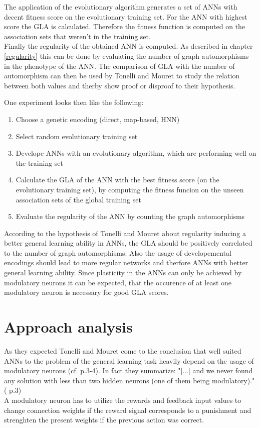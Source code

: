 \documentclass[12pt,twoside]{article}
\theoremstyle{plain}
\theoremstyle{definition}
\theoremstyle{remark}
\begin{document}
The application of the evolutionary algorithm generates a set of ANNs with decent fitness score on the evolutionary training set. For the ANN with highest score the GLA is calculated. Therefore the fitness function is computed on the association sets that weren't in the training set.\\
Finally the regularity of the obtained ANN is computed. As described in chapter \ref{regularity} this can be done by evaluating the number of graph automorphisms in the phenotype of the ANN. The comparison of GLA with the number of automorphism can then be used by Tonelli and Mouret to study the relation between both values and  therby show proof or disproof to their hypothesis. \medskip

One experiment looks then like the following:
\begin{enumerate}
	\item Choose a genetic encoding (direct, map-based, HNN)
	\item Select random evolutionary training set
	\item Develope ANNs with an evolutionary algorithm, which are performing well on the training set
	\item Calculate the GLA of the ANN with the best fitness score (on the evolutionary training set), by computing the fitness funcion on the unseen association sets of the global training set
	\item Evaluate the regularity of the ANN by counting the graph automorphisms
\end{enumerate}

According to the hypothesis of Tonelli and Mouret about regularity inducing a better general learning ability in ANNs, the GLA should be positively correlated to the number of graph automorphisms. 
Also the usage of developemental encodings should lead to more regular networks and therfore ANNs with better general learning ability.
Since plasticity in the ANNs can only be achieved by modulatory neurons it can be expected, that the occurence of at least one modulatory neuron is necessary for good GLA scores. 

\section{Approach analysis}
\label{sec:analysis}
As they expected Tonelli and Mouret come to the conclusion that well suited ANNs to the problem of the general learning task heavily depend on the usage of modulatory neurons (cf. \cite{citeulike:12788284} p.3-4). In fact they summarize: "[...] and we never found any solution with less than two hidden neurons (one of them being modulatory)." (\cite{citeulike:12788284} p.3)\\
A modulatory neuron has to utilize the rewards and feedback input values to change connection weights if the reward signal corresponds to a punishment and strenghten the present weights if the previous action was correct.\medskip
\end{document}
